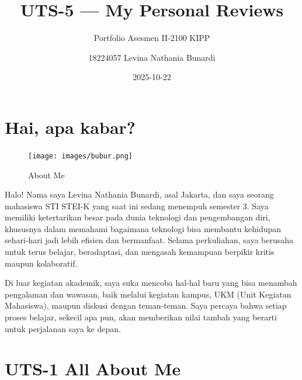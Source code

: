 \documentclass[
  letterpaper,
  DIV=11,
  numbers=noendperiod]{scrreprt}
\title{UTS-5 --- My Personal Reviews}
\subtitle{Portfolio Asesmen II-2100 KIPP}
\author{18224057 Levina Nathania Bunardi}
\date{2025-10-22}
\renewcommand*\contentsname{Table of contents}
\newcommand\contentsname{Table of contents}
\begin{document}
\maketitle

\renewcommand*\contentsname{Table of contents}
{
\hypersetup{linkcolor=}
\setcounter{tocdepth}{2}
\tableofcontents
}


\chapter*{Hai, apa kabar?}\label{hai-apa-kabar}


\begin{figure}[H]

{\centering \texttt{[image: images/bubur.png]}

}

\caption{About Me}

\end{figure}%

Halo! Nama saya Levina Nathania Bunardi, asal Jakarta, dan saya seorang
mahasiswa STI STEI-K yang saat ini sedang menempuh semester 3. Saya
memiliki ketertarikan besar pada dunia teknologi dan pengembangan diri,
khususnya dalam memahami bagaimana teknologi bisa membantu kehidupan
sehari-hari jadi lebih efisien dan bermanfaat. Selama perkuliahan, saya
berusaha untuk terus belajar, beradaptasi, dan mengasah kemampuan
berpikir kritis maupun kolaboratif.

Di luar kegiatan akademik, saya suka mencoba hal-hal baru yang bisa
menambah pengalaman dan wawasan, baik melalui kegiatan kampus, UKM (Unit
Kegiatan Mahasiswa), maupun diskusi dengan teman-teman. Saya percaya
bahwa setiap proses belajar, sekecil apa pun, akan memberikan nilai
tambah yang berarti untuk perjalanan saya ke depan.


\chapter{UTS-1 All About Me}\label{uts-1-all-about-me}
\end{document}
